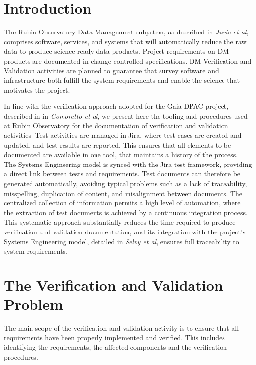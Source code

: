 \section{Introduction}

The Rubin Observatory Data Management subystem, as described in \textit{Juric et al}\cite{2015arXiv151207914J},
comprises software, services, and systems that will automatically reduce the raw data to produce science-ready data products.
Project requirements on DM products are documented in change-controlled specifications. DM Verification and Validation activities
are planned to guarantee that survey software and infrastructure both fulfill the system requirements
and enable the science that motivates the project.

In line with the verification approach adopted for the Gaia DPAC project, described in in \textit{Comoretto et al}\cite{10.1117/12.926797},
we present here the tooling and procedures used at Rubin Observatory for the documentation of verification and
validation activities. Test activities are managed in Jira, where test cases are created and updated, and test results
are reported. This ensures that all elements to be documented are available in one tool, that maintains a history of
the process. The Systems Engineering model is synced with the Jira test framework, providing a direct link between
tests and requirements. Test documents can therefore be generated automatically, avoiding typical problems
such as a lack of traceability, misspelling, duplication of content, and misalignment between documents. The
centralized collection of information permits a high level of automation, where the extraction of test documents is
achieved by a continuous integration process. This systematic approach substantially reduces the time required to
produce verification and validation documentation, and its integration with the project's Systems Engineering model,
detailed in \textit{Selvy et al}\cite{10.1117/12.2310125}, ensures full traceability to system requirements.


\section{The Verification and Validation Problem}

The main scope of the verification and validation activity is to ensure that all requirements have been properly implemented and verified.
This includes identifying the requirements, the affected components and the verification procedures.


